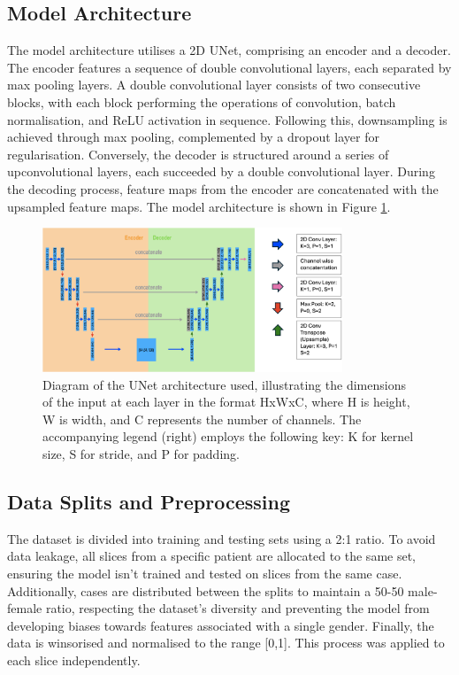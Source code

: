 \documentclass[11pt]{article}
\begin{document}
\subsection{Model Architecture}
The model architecture utilises a 2D UNet, comprising an encoder and a decoder. The encoder features a sequence of double convolutional layers, each separated by max pooling layers. A double convolutional layer consists of two consecutive blocks, with each block performing the operations of convolution, batch normalisation, and ReLU activation in sequence. Following this, downsampling is achieved through max pooling, complemented by a dropout layer for regularisation. Conversely, the decoder is structured around a series of upconvolutional layers, each succeeded by a double convolutional layer. During the decoding process, feature maps from the encoder are concatenated with the upsampled feature maps. The model architecture is shown in Figure \ref{fig:unet}.
\begin{figure}[H]
    \centering
    \includegraphics[width=0.8\textwidth]{figs/unet.png}
    \caption{Diagram of the UNet architecture used, illustrating the dimensions of the input at each layer in the format HxWxC, where H is height, W is width, and C represents the number of channels. The accompanying legend (right) employs the following key: K for kernel size, S for stride, and P for padding.}
    \label{fig:unet}
\end{figure}

\subsection{Data Splits and Preprocessing}
The dataset is divided into training and testing sets using a 2:1 ratio. To avoid data leakage, all slices from a specific patient are allocated to the same set, ensuring the model isn't trained and tested on slices from the same case. Additionally, cases are distributed between the splits to maintain a 50-50 male-female ratio, respecting the dataset's diversity and preventing the model from developing biases towards features associated with a single gender.
Finally, the data is winsorised and normalised to the range [0,1]. This process was applied to each slice independently.  
\end{document}
